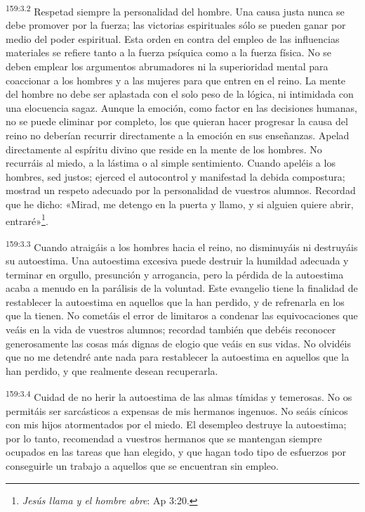 \par
\textsuperscript{159:3.2} Respetad siempre la personalidad del hombre. Una causa justa nunca se debe promover por la fuerza; las victorias espirituales sólo se pueden ganar por medio del poder espiritual. Esta orden en contra del empleo de las influencias materiales se refiere tanto a la fuerza psíquica como a la fuerza física. No se deben emplear los argumentos abrumadores ni la superioridad mental para coaccionar a los hombres y a las mujeres para que entren en el reino. La mente del hombre no debe ser aplastada con el solo peso de la lógica, ni intimidada con una elocuencia sagaz. Aunque la emoción, como factor en las decisiones humanas, no se puede eliminar por completo, los que quieran hacer progresar la causa del reino no deberían recurrir directamente a la emoción en sus enseñanzas. Apelad directamente al espíritu divino que reside en la mente de los hombres. No recurráis al miedo, a la lástima o al simple sentimiento. Cuando apeléis a los hombres, sed justos; ejerced el autocontrol y manifestad la debida compostura; mostrad un respeto adecuado por la personalidad de vuestros alumnos. Recordad que he dicho: «Mirad, me detengo en la puerta y llamo, y si alguien quiere abrir, entraré»\footnote{\textit{Jesús llama y el hombre abre}: Ap 3:20.}.

\par
\textsuperscript{159:3.3} Cuando atraigáis a los hombres hacia el reino, no disminuyáis ni destruyáis su autoestima. Una autoestima excesiva puede destruir la humildad adecuada y terminar en orgullo, presunción y arrogancia, pero la pérdida de la autoestima acaba a menudo en la parálisis de la voluntad. Este evangelio tiene la finalidad de restablecer la autoestima en aquellos que la han perdido, y de refrenarla en los que la tienen. No cometáis el error de limitaros a condenar las equivocaciones que veáis en la vida de vuestros alumnos; recordad también que debéis reconocer generosamente las cosas más dignas de elogio que veáis en sus vidas. No olvidéis que no me detendré ante nada para restablecer la autoestima en aquellos que la han perdido, y que realmente desean recuperarla.

\par
\textsuperscript{159:3.4} Cuidad de no herir la autoestima de las almas tímidas y temerosas. No os permitáis ser sarcásticos a expensas de mis hermanos ingenuos. No seáis cínicos con mis hijos atormentados por el miedo. El desempleo destruye la autoestima; por lo tanto, recomendad a vuestros hermanos que se mantengan siempre ocupados en las tareas que han elegido, y que hagan todo tipo de esfuerzos por conseguirle un trabajo a aquellos que se encuentran sin empleo.


